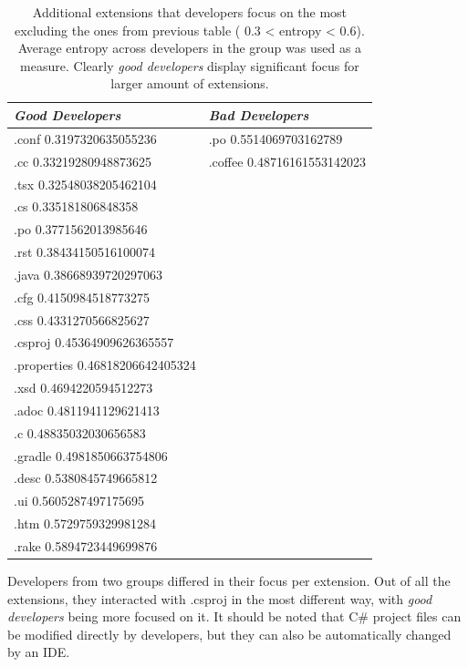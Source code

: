 \begin{table}[htpb]
\begin{center}
\begin{tabular}{ | m{20em} | m{20em}| } 
\hline
\textit{Good Developers} & \textit{Bad Developers} \\ 
\hline \hline
.conf 0.3197320635055236 & .po 0.5514069703162789\\
.cc 0.33219280948873625 & .coffee 0.48716161553142023 \\
.tsx 0.32548038205462104 & \\
.cs 0.335181806848358  & \\
.po 0.3771562013985646 & \\
.rst 0.38434150516100074 & \\
.java 0.38668939720297063  & \\
.cfg 0.4150984518773275  & \\
.css 0.4331270566825627 & \\
.csproj 0.45364909626365557 & \\
.properties 0.46818206642405324 & \\
.xsd 0.4694220594512273 & \\
.adoc 0.4811941129621413  & \\
.c 0.48835032030656583  & \\
.gradle 0.4981850663754806  & \\
.desc 0.5380845749665812  & \\
.ui 0.5605287497175695 & \\
.htm 0.5729759329981284 & \\
.rake 0.5894723449699876 & \\
\hline
\end{tabular}
\end{center}
\caption[Extended Extensions that Developers Focus on the Most]{Additional extensions that developers focus on the most excluding the ones from previous table ( 0.3 < entropy < 0.6). Average entropy across developers in the group was used as a measure. Clearly \textit{good developers} display significant focus for larger amount of extensions.}
\label{table:focused_extended}
\end{table}

Developers from two groups differed in their focus per extension. Out of all the extensions, they interacted with .csproj in the most different way, with \textit{good developers} being more focused on it. It should be noted that C\# project files can be modified directly by developers, but they can also be automatically changed by an IDE.






